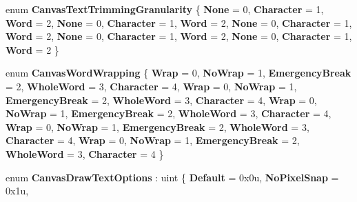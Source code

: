 \begin{DoxyCompactItemize}
\mbox{\label{namespace_microsoft_1_1_graphics_1_1_canvas_1_1_text_a24d5fc875e6366ffdebd4fc9db910c21}} 
enum {\bfseries Canvas\+Text\+Trimming\+Granularity} \{ \newline
{\bfseries None} = 0, 
{\bfseries Character} = 1, 
{\bfseries Word} = 2, 
{\bfseries None} = 0, 
\newline
{\bfseries Character} = 1, 
{\bfseries Word} = 2, 
{\bfseries None} = 0, 
{\bfseries Character} = 1, 
\newline
{\bfseries Word} = 2, 
{\bfseries None} = 0, 
{\bfseries Character} = 1, 
{\bfseries Word} = 2, 
\newline
{\bfseries None} = 0, 
{\bfseries Character} = 1, 
{\bfseries Word} = 2
 \}
\item 
\mbox{\label{namespace_microsoft_1_1_graphics_1_1_canvas_1_1_text_aad13d6b470583df1dcc8167f6568eb39}} 
enum {\bfseries Canvas\+Word\+Wrapping} \{ \newline
{\bfseries Wrap} = 0, 
{\bfseries No\+Wrap} = 1, 
{\bfseries Emergency\+Break} = 2, 
{\bfseries Whole\+Word} = 3, 
\newline
{\bfseries Character} = 4, 
{\bfseries Wrap} = 0, 
{\bfseries No\+Wrap} = 1, 
{\bfseries Emergency\+Break} = 2, 
\newline
{\bfseries Whole\+Word} = 3, 
{\bfseries Character} = 4, 
{\bfseries Wrap} = 0, 
{\bfseries No\+Wrap} = 1, 
\newline
{\bfseries Emergency\+Break} = 2, 
{\bfseries Whole\+Word} = 3, 
{\bfseries Character} = 4, 
{\bfseries Wrap} = 0, 
\newline
{\bfseries No\+Wrap} = 1, 
{\bfseries Emergency\+Break} = 2, 
{\bfseries Whole\+Word} = 3, 
{\bfseries Character} = 4, 
\newline
{\bfseries Wrap} = 0, 
{\bfseries No\+Wrap} = 1, 
{\bfseries Emergency\+Break} = 2, 
{\bfseries Whole\+Word} = 3, 
\newline
{\bfseries Character} = 4
 \}
\item 
\mbox{\label{namespace_microsoft_1_1_graphics_1_1_canvas_1_1_text_a186331309945bc8dcbfe364bc6f55fdb}} 
enum {\bfseries Canvas\+Draw\+Text\+Options} \+: uint \{ \newline
{\bfseries Default} = 0x0u, 
{\bfseries No\+Pixel\+Snap} = 0x1u, 

\end{DoxyCompactItemize}
